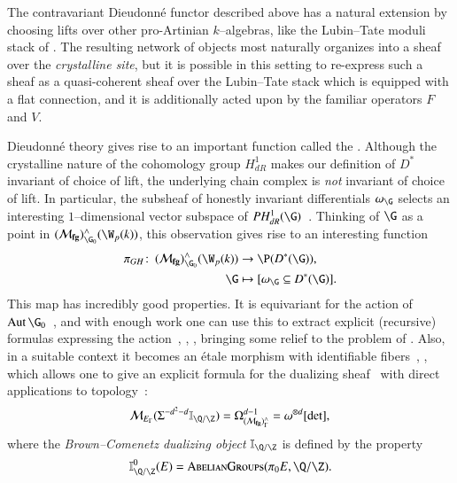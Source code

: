 \begin{remark}
The contravariant Dieudonn\'e functor described above has a natural extension by choosing lifts over other pro-Artinian $k$--algebras, like the Lubin--Tate moduli stack of .  The resulting network of objects most naturally organizes into a sheaf over the \textit{crystalline site}, but it is possible in this setting to re-express such a sheaf as a quasi-coherent sheaf over the Lubin--Tate stack which is equipped with a flat connection, and it is additionally acted upon by the familiar operators $F$ and $V$.
\end{remark}

\begin{remark}\label{ThePeriodMapSection}
Dieudonn\'e theory gives rise to an important function called the .  Although the crystalline nature of the cohomology group $H^1_{dR}$ makes our definition of $D^*$ invariant of choice of lift, the underlying chain complex is \emph{not} invariant of choice of lift.  In particular, the subsheaf of honestly invariant differentials $\omega_{\G}$ selects an interesting $1$--dimensional vector subspace of $PH^1_{dR}(\G)$~\cite[Section 2.3]{MoravaCobordismComodules}.  Thinking of $\G$ as a point in $(\moduli{fg})^\wedge_{\G_0}(\W_p(k))$, this observation gives rise to an interesting function
\begin{align*}
\pi_{GH}\co (\moduli{fg})^\wedge_{\G_0}(\W_p(k)) & \to \P(D^*(\G)), \\
\G & \mapsto [\omega_{\G} \subseteq D^*(\G)].
\end{align*}
This map has incredibly good properties.  It is equivariant for the action of $\Aut \G_0$~\cite[Theorem 1]{HopkinsGrossAnnouncement}, and with enough work one can use this to extract explicit (recursive) formulas expressing the action~\cite{DevinatzHopkins}, \cite[Section 24]{StricklandFPFP}, \cite[Section 22]{HopkinsGrossEquivVBs}, bringing some relief to the problem of .  Also, in a suitable context it becomes an \'etale morphism with identifiable fibers~\cite[Theorem 1]{HopkinsGrossAnnouncement}, \cite[Sections 23-4]{HopkinsGrossEquivVBs}, which allows one to give an explicit formula for the dualizing sheaf~\cite[Corollary 3]{HopkinsGrossAnnouncement} with direct applications to topology~\cite[Theorem 6]{HopkinsGrossAnnouncement}: \[\context{E_\Gamma}(\Susp^{-d^2 - d} \mathbb I_{\Q/\Z}) = \Omega^{d - 1}_{(\moduli{fg})^\wedge_\Gamma} = \omega^{\otimes d}[\det],\] where the \textit{Brown--Comenetz dualizing object} $\mathbb I_{\Q/\Z}$ is defined by the property \[\mathbb I_{\Q/\Z}^0(E) = \CatOf{AbelianGroups}(\pi_0 E, \Q/\Z).\]


\end{remark}
